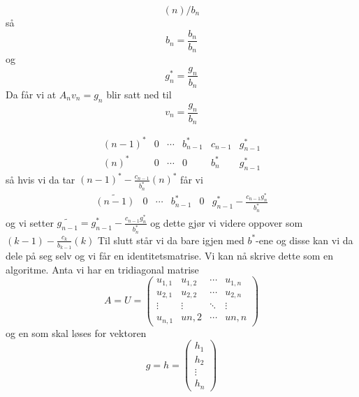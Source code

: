 \documentclass[english,notitlepage]{revtex4-1}  %
\begin{document}
$$
(n)/b_n
$$
så
$$
b_n=\frac{b_n}{b_n}
$$
og
$$
g_n^*=\frac{g_n}{b_n}
$$
Da får vi at
$
A_n v_n=g_n
$
blir satt ned til
$$
v_n=\frac{g_n}{b_n}
$$

$$
\begin{matrix}
(n-1)^* & 0& \cdots & b_{n-1}^* &c_{n-1}&g_{n-1}^* \\
(n)^* & 0 & \cdots & 0 & b_{n}^*& g_{n-1}^*
\end{matrix}
$$
så hvis vi da tar $(n-1)^*-\frac{c_{n-1}}{b_n^*}(n)^*$ får vi
$$
\begin{matrix}
\tilde{(n-1)} & 0 & \cdots & b_{n-1}^* & 0 & g_{n-1}^*-\frac{c_{n-1} g_n^*}{b_n^*}
\end{matrix}
$$
og vi setter $\tilde{g_{n-1}}= g_{n-1}^*-\frac{c_{n-1} g_n^*}{b_n^*}$ og dette gjør vi videre oppover som $(k-1)-\frac{c_k}{b_{k-1}}(k)$
Til slutt står vi da bare igjen med $b^*$-ene og disse kan vi da dele på seg selv og vi får en identitetsmatrise.
Vi kan nå skrive dette som en algoritme. Anta vi har en tridiagonal matrise
$$
A=U=\begin{pmatrix}
u_{1,1}&u_{1,2}&\cdots & u_{1,n} \\
u_{2,1}&u_{2,2}&\cdots & u_{2,n} \\
\vdots & \vdots& \ddots & \vdots \\
u_{n,1} & u{n,2}& \cdots & u{n,n}
\end{pmatrix}
$$
og en som skal løses for vektoren
$$
g=h=\begin{pmatrix}
h_1\\h_2\\\vdots \\ h_n
\end{pmatrix}
$$
\end{document}

